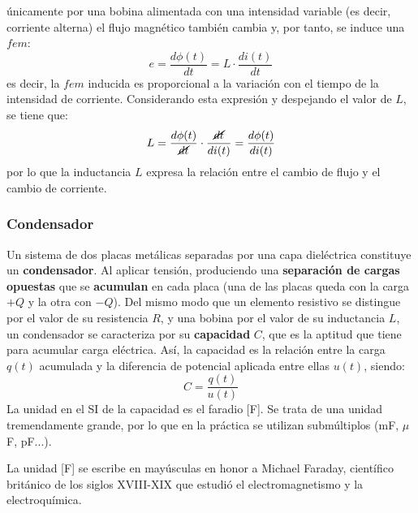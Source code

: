 \begin{remark}
          únicamente por una bobina alimentada con una intensidad
          variable (es decir, corriente alterna) el flujo magnético
          también cambia y, por tanto, se induce una $fem$:
          \begin{equation*}
            e=\dfrac{d\phi(t)}{dt}=L\cdot \dfrac{di(t)}{dt} 
          \end{equation*}
          es decir, la $fem$ inducida es proporcional a la variación
          con el tiempo de la intensidad de corriente. Considerando
          esta expresión y despejando el valor de $L$, se tiene que:
          \begin{equation*}
            L= \dfrac{d\phi(t)}{\cancel{dt}}\cdot\dfrac{\cancel{dt}}{di(t)}=\dfrac{d\phi(t)}{di(t)}
          \end{equation*}
          por lo que la inductancia $L$ expresa la relación entre el
          cambio de flujo y el cambio de corriente.
	\end{remark}
	
	
	\subsubsection{Condensador}\label{sec.condensador}
	
	Un sistema de dos placas metálicas separadas por una capa
        dieléctrica constituye un \textbf{condensador}. Al aplicar
        tensión, produciendo una \textbf{separación de cargas
          opuestas} que se \textbf{acumulan} en cada placa (una de las
        placas queda con la carga $+Q$ y la otra con $-Q$). Del mismo
        modo que un elemento resistivo se distingue por el valor de su
        resistencia $R$, y una bobina por el valor de su inductancia
        $L$, un condensador se caracteriza por su \textbf{capacidad}
        $C$, que es la aptitud que tiene para acumular carga
        eléctrica. Así, la capacidad es la relación entre la carga
        $q(t)$ acumulada y la diferencia de potencial aplicada entre
        ellas $u(t)$, siendo:
	\begin{equation}\label{eq.cqu}
          \boxed{C=\dfrac{q(t)}{u(t)}}
	\end{equation}
	La unidad en el SI de la capacidad es el faradio [F]. Se trata
        de una unidad tremendamente grande, por lo que en la práctica
        se utilizan submúltiplos (mF, $\mu$F, pF...).
	\begin{remark}
          La unidad [F] se escribe en mayúsculas en honor a Michael
          Faraday, científico británico de los siglos XVIII-XIX que
          estudió el electromagnetismo y la electroquímica.
	\end{remark}
	
